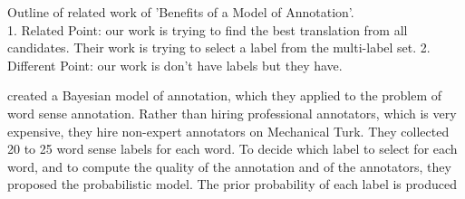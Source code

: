 \documentclass[11pt]{article}
\begin{document}
Outline of related work of 'Benefits of a Model of Annotation'.\\
1. Related Point: our work is trying to find the best translation from all candidates. Their work is trying to select a label from the multi-label set.
2. Different Point: our work is don't have labels but they have.

 created a Bayesian model of annotation, which they applied to the problem of word sense annotation. Rather than hiring professional annotators, which is very expensive, they hire non-expert annotators on Mechanical Turk.  They collected 20 to 25 word sense labels for each word. To decide which label to select for each word, and to compute the quality of the annotation and of the annotators, they proposed the probabilistic model. The prior probability  of each label is produced


\end{document}

